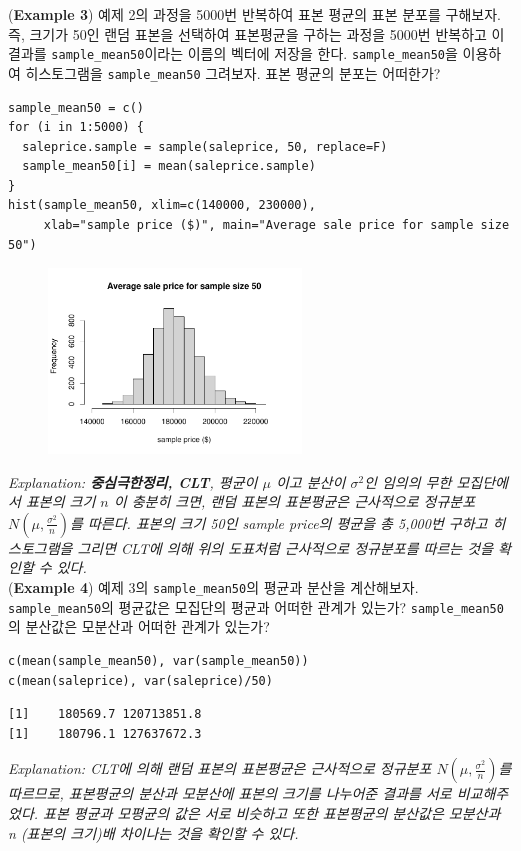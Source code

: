 \documentclass{article}
\begin{document}
(\textbf{Example 3}) 예제 2의 과정을 5000번 반복하여 표본 평균의 표본 분포를 구해보자. 즉, 크기가 50인 랜덤 표본을 선택하여 표본평균을 구하는 과정을 5000번 반복하고 이 결과를
\texttt{sample\_mean50}이라는 이름의 벡터에 저장을 한다. \texttt{sample\_mean50}을 이용하여 히스토그램을 \texttt{sample\_mean50} 그려보자. 표본 평균의 분포는 어떠한가?
\begin{lstlisting}[style={r-style}]
sample_mean50 = c()
for (i in 1:5000) {
  saleprice.sample = sample(saleprice, 50, replace=F)
  sample_mean50[i] = mean(saleprice.sample)
}
hist(sample_mean50, xlim=c(140000, 230000),
     xlab="sample price ($)", main="Average sale price for sample size 50")
\end{lstlisting}
\begin{figure}[htb!]
    \centering
    \includegraphics[width=0.6\textwidth]{fig/ex3.pdf}
\end{figure}
\emph{Explanation: \textbf{중심극한정리, CLT}, 평균이 $\mu$ 이고 분산이 $\sigma^2$인 임의의 무한 모집단에서 표본의 크기 $n$ 이 충분히 크면, 랜덤 표본의 표본평균은 근사적으로 정규분포 $N(\mu, \frac{\sigma^2}{n})$를 따른다. 표본의 크기 50인 sample price의 평균을 총 5,000번 구하고 히스토그램을 그리면 CLT에 의해 위의 도표처럼 근사적으로 정규분포를 따르는 것을 확인할 수 있다.} \\

(\textbf{Example 4}) 예제 3의 \texttt{sample\_mean50}의 평균과 분산을 계산해보자. \texttt{sample\_mean50}의 평균값은 모집단의 평균과 어떠한 관계가 있는가? \texttt{sample\_mean50}의 분산값은 모분산과 어떠한 관계가 있는가? 
\begin{lstlisting}[style={r-style}]
c(mean(sample_mean50), var(sample_mean50))
c(mean(saleprice), var(saleprice)/50)
\end{lstlisting}
\begin{lstlisting}[style={out-style}]
[1]    180569.7 120713851.8
[1]    180796.1 127637672.3
\end{lstlisting}
\emph{Explanation: CLT에 의해 랜덤 표본의 표본평균은 근사적으로 정규분포 $N(\mu, \frac{\sigma^2}{n})$를 따르므로, 표본평균의 분산과 모분산에 표본의 크기를 나누어준 결과를 서로 비교해주었다. 표본 평균과 모평균의 값은 서로 비슷하고 또한 표본평균의 분산값은 모분산과 n (표본의 크기)배 차이나는 것을 확인할 수 있다.}  \\
\end{document}

